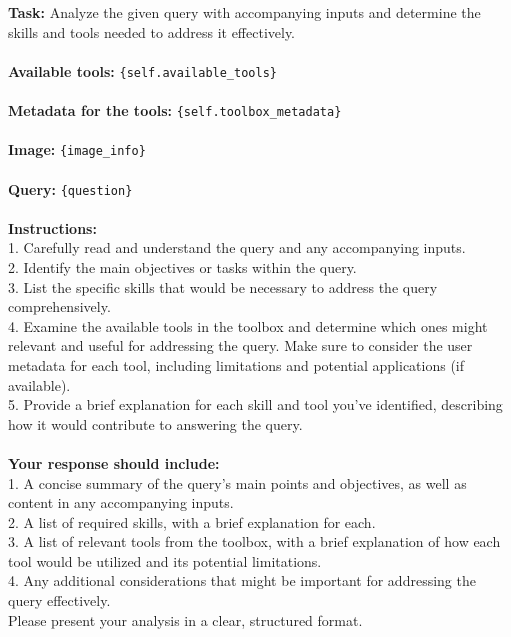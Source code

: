 \begin{textcolorbox}
\textbf{Task:} Analyze the given query with accompanying inputs and determine the skills and tools needed to address it effectively.
\\\\
\textbf{Available tools:} \texttt{\{self.available\_tools\}}
\\\\
\textbf{Metadata for the tools:} \texttt{\{self.toolbox\_metadata\}}
\\\\
\textbf{Image:} \texttt{\{image\_info\}}
\\\\
\textbf{Query:} \texttt{\{question\}}
\\\\
\textbf{Instructions:}
\\
1. Carefully read and understand the query and any accompanying inputs.
\\
2. Identify the main objectives or tasks within the query.
\\
3. List the specific skills that would be necessary to address the query comprehensively.
\\
4. Examine the available tools in the toolbox and determine which ones might relevant and useful for addressing the query. Make sure to consider the user metadata for each tool, including limitations and potential applications (if available).
\\
5. Provide a brief explanation for each skill and tool you've identified, describing how it would contribute to answering the query.
\\\\
\textbf{Your response should include:}
\\
1. A concise summary of the query's main points and objectives, as well as content in any accompanying inputs.
\\
2. A list of required skills, with a brief explanation for each.
\\
3. A list of relevant tools from the toolbox, with a brief explanation of how each tool would be utilized and its potential limitations.
\\
4. Any additional considerations that might be important for addressing the query effectively.
\\
Please present your analysis in a clear, structured format.
\end{textcolorbox}
